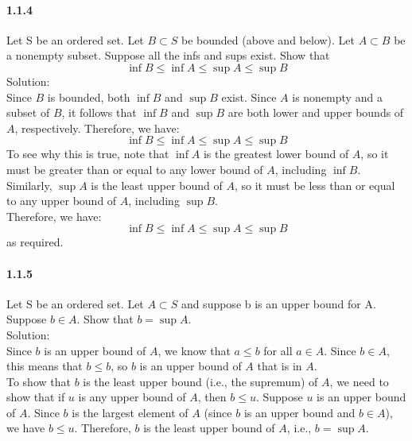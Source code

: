 \documentclass{article}
\begin{document}
\paragraph{1.1.4}
Let S be an ordered set. Let $B \subset S$ be bounded (above and below). Let $A \subset B$ be a nonempty subset. Suppose all the infs and sups exist. Show that $$\inf B \leq \inf A \leq \sup A \leq \sup B$$
Solution:\\
Since $B$ is bounded, both $\inf B$ and $\sup B$ exist. Since $A$ is nonempty and a subset of $B$, it follows that $\inf B$ and $\sup B$ are both lower and upper bounds of $A$, respectively. Therefore, we have:
$$\inf B \leq \inf A \leq \sup A \leq \sup B$$
To see why this is true, note that $\inf A$ is the greatest lower bound of $A$, so it must be greater than or equal to any lower bound of $A$, including $\inf B$. Similarly, $\sup A$ is the least upper bound of $A$, so it must be less than or equal to any upper bound of $A$, including $\sup B$.\\
Therefore, we have:
$$\inf B \leq \inf A \leq \sup A \leq \sup B$$
as required.
\paragraph{1.1.5}
Let S be an ordered set. Let $A \subset S$ and suppose b is an upper bound for A. Suppose $b \in A$. Show that $b = \sup A$.\\
Solution:\\
Since $b$ is an upper bound of $A$, we know that $a \leq b$ for all $a \in A$. Since $b \in A$, this means that $b \leq b$, so $b$ is an upper bound of $A$ that is in $A$.\\
To show that $b$ is the least upper bound (i.e., the supremum) of $A$, we need to show that if $u$ is any upper bound of $A$, then $b \leq u$. Suppose $u$ is an upper bound of $A$. Since $b$ is the largest element of $A$ (since $b$ is an upper bound and $b \in A$), we have $b \leq u$. Therefore, $b$ is the least upper bound of $A$, i.e., $b = \sup A$.
\end{document}
